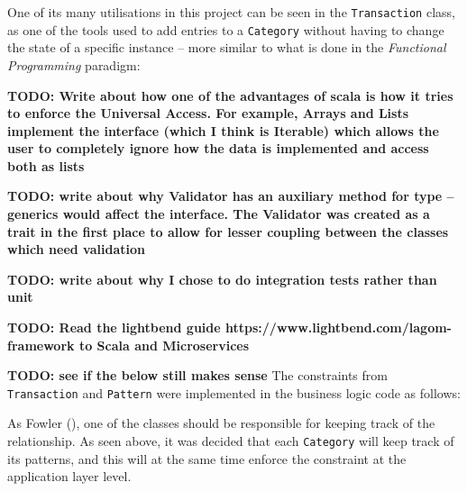One of its many utilisations in this project can be seen in the
\texttt{Transaction} class, as one of the tools used to add entries to a
\texttt{Category} without having to change the state of a specific instance --
more similar to what is done in the \emph{Functional Programming} paradigm:
{
  \small
  
}


\textbf{TODO: Write about how one of the advantages of scala is how it tries to
enforce the Universal Access. For example, Arrays and Lists implement the
interface (which I think is Iterable) which allows the user to completely
ignore how the data is implemented and access both as lists}

\textbf{TODO: write about why Validator has an auxiliary method for type --
generics would affect the interface. The Validator was created as a trait in
the first place to allow for lesser coupling between the classes which need
validation}

\textbf{TODO: write about why I chose to do integration tests rather than unit}

\textbf{TODO: Read the lightbend guide
https://www.lightbend.com/lagom-framework to Scala and Microservices}

\textbf{TODO: see if the below still makes sense}
The constraints from \texttt{Transaction} and \texttt{Pattern} were implemented
in the business logic code as follows:
{
  \small
  
}

{
  \small
  
}

As Fowler (\citeyear[][]{fowler1997analysis}), one of the classes should be
responsible for keeping track of the relationship. As seen above, it was
decided that each \texttt{Category} will keep track of its patterns, and this
will at the same time enforce the constraint at the application layer level.


